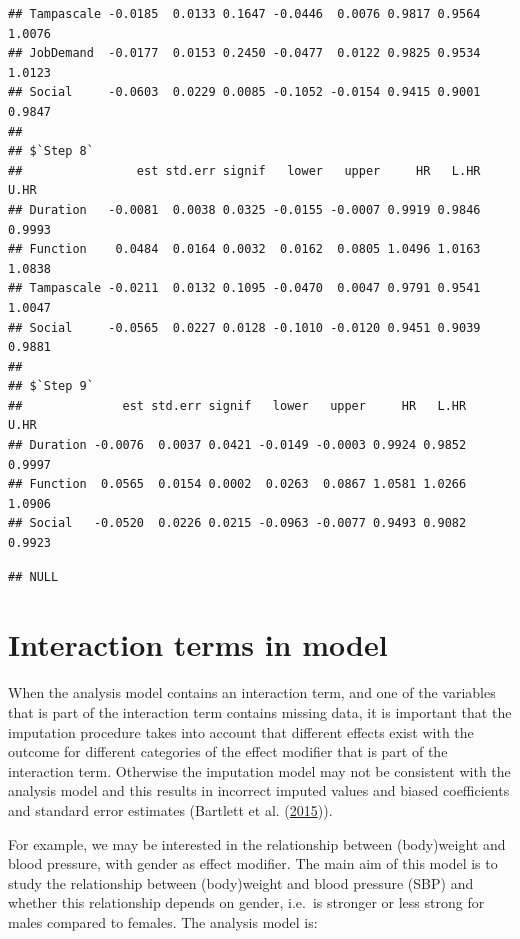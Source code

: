 \documentclass[
]{book}
\newenvironment{Shaded}{\begin{snugshade}}{\end{snugshade}}
\newcommand{\NormalTok}[1]{#1}
\newcommand{\OperatorTok}[1]{\textcolor[rgb]{0.81,0.36,0.00}{\textbf{#1}}}
\begin{document}
\begin{verbatim}
## Tampascale -0.0185  0.0133 0.1647 -0.0446  0.0076 0.9817 0.9564 1.0076
## JobDemand  -0.0177  0.0153 0.2450 -0.0477  0.0122 0.9825 0.9534 1.0123
## Social     -0.0603  0.0229 0.0085 -0.1052 -0.0154 0.9415 0.9001 0.9847
## 
## $`Step 8`
##                est std.err signif   lower   upper     HR   L.HR   U.HR
## Duration   -0.0081  0.0038 0.0325 -0.0155 -0.0007 0.9919 0.9846 0.9993
## Function    0.0484  0.0164 0.0032  0.0162  0.0805 1.0496 1.0163 1.0838
## Tampascale -0.0211  0.0132 0.1095 -0.0470  0.0047 0.9791 0.9541 1.0047
## Social     -0.0565  0.0227 0.0128 -0.1010 -0.0120 0.9451 0.9039 0.9881
## 
## $`Step 9`
##              est std.err signif   lower   upper     HR   L.HR   U.HR
## Duration -0.0076  0.0037 0.0421 -0.0149 -0.0003 0.9924 0.9852 0.9997
## Function  0.0565  0.0154 0.0002  0.0263  0.0867 1.0581 1.0266 1.0906
## Social   -0.0520  0.0226 0.0215 -0.0963 -0.0077 0.9493 0.9082 0.9923
\end{verbatim}

\begin{Shaded}
\end{Shaded}

\begin{verbatim}
## NULL
\end{verbatim}

\hypertarget{interaction-terms-in-model}{%
\section{Interaction terms in model}\label{interaction-terms-in-model}}

When the analysis model contains an interaction term, and one of the
variables that is part of the interaction term contains missing data, it
is important that the imputation procedure takes into account that
different effects exist with the outcome for different categories of the
effect modifier that is part of the interaction term. Otherwise the
imputation model may not be consistent with the analysis model and this
results in incorrect imputed values and biased coefficients and standard
error estimates (Bartlett et al.
(\protect\hyperlink{ref-Bartlett2015}{2015})).

For example, we may be interested in the relationship between
(body)weight and blood pressure, with gender as effect modifier. The
main aim of this model is to study the relationship between (body)weight
and blood pressure (SBP) and whether this relationship depends on
gender, i.e.~is stronger or less strong for males compared to females.
The analysis model is:
\end{document}
